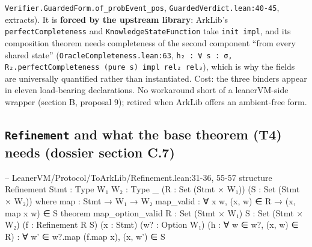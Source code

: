 \texttt{V\allowbreak{}e\allowbreak{}r\allowbreak{}i\allowbreak{}f\allowbreak{}i\allowbreak{}e\allowbreak{}r\allowbreak{}.\allowbreak{}G\allowbreak{}u\allowbreak{}a\allowbreak{}r\allowbreak{}d\allowbreak{}e\allowbreak{}d\allowbreak{}F\allowbreak{}o\allowbreak{}r\allowbreak{}m\allowbreak{}.\allowbreak{}o\allowbreak{}f\allowbreak{}\_\allowbreak{}p\allowbreak{}r\allowbreak{}o\allowbreak{}b\allowbreak{}E\allowbreak{}v\allowbreak{}e\allowbreak{}n\allowbreak{}t\allowbreak{}\_\allowbreak{}p\allowbreak{}o\allowbreak{}s}, \texttt{GuardedVerdict.\allowbreak{}lean:40-{}45}, extracts). It is \textbf{forced by the upstream library}: ArkLib's \texttt{perfectCompleteness} and \texttt{KnowledgeStateFunction} take \texttt{init impl}, and its composition theorem needs completeness of the second component \enquote{from every shared state} (\texttt{OracleCompleteness.\allowbreak{}lean:63}, \texttt{h\allowbreak{}₂\allowbreak{} :\allowbreak{} ∀\allowbreak{} s\allowbreak{} :\allowbreak{} σ\allowbreak{},\allowbreak{} R\allowbreak{}₂\allowbreak{}.\allowbreak{}p\allowbreak{}e\allowbreak{}r\allowbreak{}f\allowbreak{}e\allowbreak{}c\allowbreak{}t\allowbreak{}C\allowbreak{}o\allowbreak{}m\allowbreak{}p\allowbreak{}l\allowbreak{}e\allowbreak{}t\allowbreak{}e\allowbreak{}n\allowbreak{}e\allowbreak{}s\allowbreak{}s\allowbreak{} (\allowbreak{}p\allowbreak{}u\allowbreak{}r\allowbreak{}e\allowbreak{} s\allowbreak{})\allowbreak{} i\allowbreak{}m\allowbreak{}p\allowbreak{}l\allowbreak{} r\allowbreak{}e\allowbreak{}l\allowbreak{}₂\allowbreak{} r\allowbreak{}e\allowbreak{}l\allowbreak{}₃}), which is why the fields are universally quantified rather than instantiated. Cost: the three binders appear in eleven load-bearing declarations. No workaround short of a leanerVM-side wrapper (section B, proposal 9); retired when ArkLib offers an ambient-free form.

\subsection{\texttt{Refinement} and what the base theorem (T4) needs (dossier section C.7)}\label{sec:gen-spine-C7}

\begin{leancode}
-- LeanerVM/Protocol/ToArkLib/Refinement.lean:31-36, 55-57
structure Refinement {Stmt : Type} {W₁ W₂ : Type _} (R : Set (Stmt × W₁))
    (S : Set (Stmt × W₂)) where
  map : Stmt → W₁ → W₂
  map_valid : ∀ x w, (x, w) ∈ R → (x, map x w) ∈ S
theorem map_option_valid {R : Set (Stmt × W₁)} {S : Set (Stmt × W₂)} (f : Refinement R S)
    (x : Stmt) (w? : Option W₁) (h : ∀ w ∈ w?, (x, w) ∈ R) :
    ∀ w' ∈ w?.map (f.map x), (x, w') ∈ S
\end{leancode}


